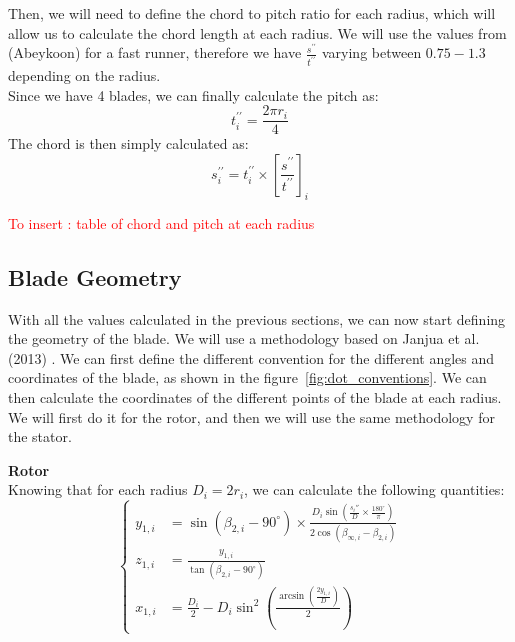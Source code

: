 Then, we will need to define the chord to pitch ratio for each radius, which will allow us to calculate the chord length at each radius. We will use the values from (Abeykoon) for a fast runner, therefore we have $\frac{s^{\prime \prime}}{t^{\prime \prime}}$ varying between $0.75 -1.3$ depending on the radius. \\
Since we have 4 blades, we can finally calculate the pitch as:
\begin{equation}
t_i^{\prime \prime} = \frac{2 \pi r_i}{4}
\end{equation}
The chord is then simply calculated as:
\begin{equation}
    s_i^{\prime \prime} = t_i^{\prime \prime} \times \left[ {\frac{s^{\prime \prime}}{t^{\prime \prime}}}\right]_i
\end{equation}

\textcolor{red}{To insert : table of chord and pitch at each radius}

\subsection{Blade Geometry}

With all the values calculated in the previous sections, we can now start defining the geometry of the blade. We will use a methodology based on Janjua et al. (2013) \cite{janjua2013}. We can first define the different convention for the different angles and coordinates of the blade, as shown in the figure~\ref{fig:dot_conventions}. We can then calculate the coordinates of the different points of the blade at each radius. We will first do it for the rotor, and then we will use the same methodology for the stator.

\textbf{Rotor} \\
Knowing that for each radius $D_i = 2 r_i$, we can calculate the following quantities:
\begin{equation}
\left\{
\begin{aligned}
y_{1,i} &= \sin(\beta_{2,i} - 90^\circ) \times \frac{D_i \sin\left(\frac{s_i''}{D} \times \frac{180^\circ}{\pi}\right)}{2 \cos(\beta_{\infty ,i} - \beta_{2,i})}\\
z_{1,i} &= \frac{y_{1,i}}{\tan(\beta_{2,i} - 90^\circ)}\\
x_{1,i} &= \frac{D_i}{2} - D_i\sin^2\left(\frac{\arcsin\left(\frac{2y_{1,i}}{D}\right)}{2}\right)
\end{aligned}
\right.
\end{equation}

